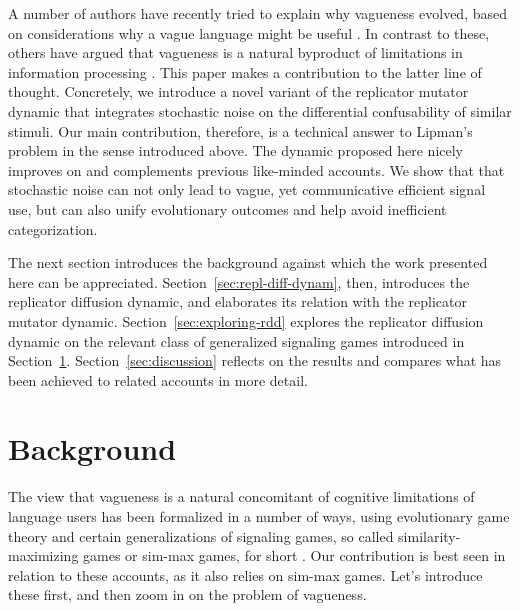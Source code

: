 A number of authors have recently tried to explain why vagueness
evolved, based on considerations why a vague language might be useful
\citep[e.g.][]{Jaegherde-Jaegher2003:A-Game-Theoreti,Deemter2009:Utility-and-Lan,Jaegherde-JaegherRooijvan-Rooij2010:Strategic-Vague,BlumeBoard2013:Intentional-Vag}. In
contrast to these, others have argued that vagueness is a natural
byproduct of limitations in information processing
\citep[e.g.][]{FrankeJager2010:Vagueness-Signa,OConnor2013:The-Evolution-o,QingFranke2014:Gradable-Adject}. This
paper makes a contribution to the latter line of thought.  Concretely,
we introduce a novel variant of the replicator mutator dynamic that
integrates stochastic noise on the differential confusability of
similar stimuli. Our main contribution, therefore, is a technical
answer to Lipman's problem in the sense introduced above. The dynamic
proposed here nicely improves on and complements previous like-minded
accounts. We show that that stochastic noise can not only lead to
vague, yet communicative efficient signal use, but can also unify
evolutionary outcomes and help avoid inefficient categorization.

The next section introduces the background against which the work
presented here can be appreciated. Section~\ref{sec:repl-diff-dynam},
then, introduces the replicator diffusion dynamic, and elaborates its
relation with the replicator mutator
dynamic. Section~\ref{sec:exploring-rdd} explores the replicator
diffusion dynamic on the relevant class of generalized signaling games
introduced in
Section~\ref{sec:background}. Section~\ref{sec:discussion} reflects on
the results and compares what has been achieved to related accounts in
more detail. 

\section{Background}
\label{sec:background}

The view that vagueness is a natural concomitant of cognitive
limitations of language users has been formalized in a number of ways,
using evolutionary game theory and certain generalizations of
signaling games, so called similarity-maximizing games or sim-max
games, for short
\citep{FrankeJager2010:Vagueness-Signa,OConnor2013:Evolving-Percep,OConnor2013:The-Evolution-o}. Our
contribution is best seen in relation to these accounts, as it also
relies on sim-max games. Let's introduce these first, and then zoom in
on the problem of vagueness.

